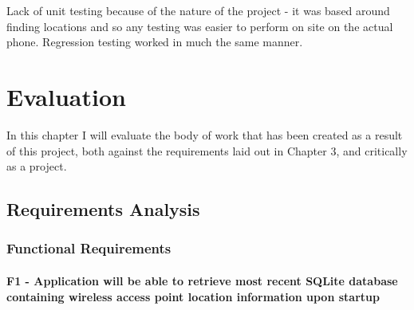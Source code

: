 \documentclass[11pt]{informatics-report}
\begin{document}
Lack of unit testing because of the nature of the project - it was based around finding locations and so any testing was easier to perform on site on the actual phone. Regression testing worked in much the same manner. 


\chapter{Evaluation}

In this chapter I will evaluate the body of work that has been created as a result of this project, both against the requirements laid out in Chapter 3, and critically as a project.

\section{Requirements Analysis}

\subsection{ Functional Requirements } 

\subsubsection{F1 - Application will be able to retrieve most recent SQLite database containing wireless access point location information upon startup}


%
%
%
%
%
%




\appendix

%
%
\end{document}
